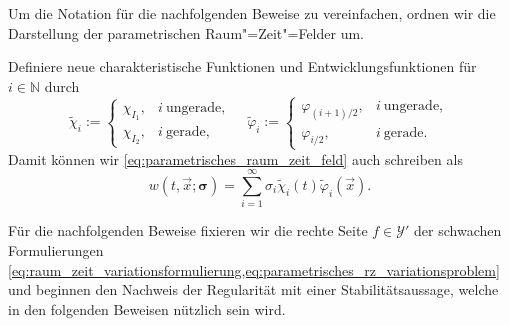 \documentclass[../main.tex]{subfiles}
\begin{document}
Um die Notation für die nachfolgenden Beweise zu vereinfachen, ordnen wir die Darstellung der parametrischen Raum"=Zeit"=Felder um.
\begin{Bemerkung}
    Definiere neue charakteristische Funktionen und Entwicklungsfunktionen für $i \in \mathbb{N}$ durch
    \begin{equation}
        \tilde{\chi}_{i} := \begin{cases}
            \chi_{I_{1}}, & i~\text{ungerade},\\
            \chi_{I_{2}}, & i~\text{gerade},
        \end{cases} \quad
        \tilde{\varphi}_{i} := \begin{cases}
            \varphi_{(i+1)/{2}}, & i~\text{ungerade},\\
            \varphi_{i / 2}, & i~\text{gerade}.
        \end{cases}
    \end{equation}
    Damit können wir \cref{eq:parametrisches_raum_zeit_feld} auch schreiben als
    \begin{equation}
        w(t, \vec{x}; \bm \sigma) = \sum_{i = 1}^{\infty} \sigma_{i} \tilde{\chi}_{i}(t) \tilde{\varphi}_{i}(\vec{x}).
    \end{equation}
\end{Bemerkung}

Für die nachfolgenden Beweise fixieren wir die rechte Seite $f \in \mathcal Y'$ der schwachen Formulierungen \cref{eq:raum_zeit_variationsformulierung,eq:parametrisches_rz_variationsproblem} und beginnen den Nachweis der Regularität mit einer Stabilitätsaussage, welche in den folgenden Beweisen nützlich sein wird.
\end{document}
